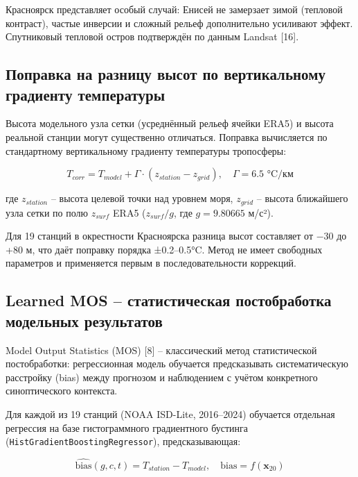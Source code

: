 \documentclass[14pt,a4paper]{extarticle}
\numberwithin{table}{section}
\numberwithin{figure}{section}
\numberwithin{equation}{section}
\begin{document}
Красноярск представляет особый случай: Енисей не замерзает
зимой (тепловой контраст), частые инверсии и сложный рельеф
дополнительно усиливают эффект. Спутниковый тепловой остров
подтверждён по данным Landsat {[}16{]}.

\subsection{Поправка на разницу высот по вертикальному градиенту температуры}\label{ux43fux43eux43fux440ux430ux432ux43aux430-ux432ux435ux440ux442ux438ux43aux430ux43bux44cux43dux44bux439-ux433ux440ux430ux434ux438ux435ux43dux442}

Высота модельного узла сетки (усреднённый рельеф ячейки ERA5) и высота
реальной станции могут существенно отличаться. Поправка вычисляется по
стандартному вертикальному градиенту температуры тропосферы:

\[T_{corr} = T_{model} + \Gamma \cdot (z_{station} - z_{grid}), \quad \Gamma = 6.5 \text{ °C/км}\]

где \(z_{station}\) -- высота целевой точки над уровнем моря,
\(z_{grid}\) -- высота ближайшего узла сетки по полю \(z_{surf}\) ERA5
(\(z_{surf}/g\), где \(g = 9.80665\) м/с²).

Для 19 станций в окрестности Красноярска разница высот составляет от −30
до +80 м, что даёт поправку порядка ±0.2--0.5°C. Метод не имеет
свободных параметров и применяется первым в последовательности коррекций.

\subsection{Learned MOS -- статистическая постобработка
модельных результатов}\label{learned-mos-ux441ux442ux430ux442ux438ux441ux442ux438ux447ux435ux441ux43aux430ux44f-ux43fux43eux441ux442ux43eux431ux440ux430ux431ux43eux442ux43aux430-ux43cux43eux434ux435ux43bux44cux43dux44bux445-ux440ux435ux437ux443ux43bux44cux442ux430ux442ux43eux432}

Model Output Statistics (MOS) {[}8{]} -- классический метод
статистической постобработки: регрессионная модель обучается
предсказывать систематическую расстройку (bias) между прогнозом и
наблюдением с учётом конкретного синоптического контекста.

Для каждой из 19 станций (NOAA ISD-Lite, 2016--2024) обучается отдельная
регрессия на базе гистограммного градиентного бустинга
(\texttt{HistGradientBoostingRegressor}), предсказывающая:

\[\widehat{\text{bias}}(g, c, t) = T_{station} - T_{model}, \quad \text{bias} = f(\mathbf{x}_{20})\]
\end{document}
